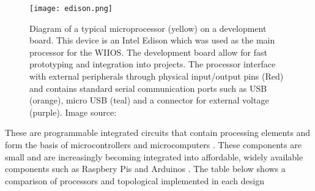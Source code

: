 \begin{figure}[H]
	\centering
	\texttt{[image: edison.png]}
	\caption{Diagram of a typical microprocessor (yellow) on a development board. This device is an Intel Edison which was used as the main processor \textcite{kohout2015device} for the WIIOS. The development board allow for fast prototyping and integration into projects. The processor interface with external peripherals through physical input/output pins (Red) and contains standard serial communication ports such as USB (orange), micro USB (teal) and a connector for external voltage (purple). Image source: \cite{edison} }
\end{figure}

These are programmable integrated circuits that contain processing elements \cite{subham2018micro} and form the basis of microcontrollers and microcomputers \cite{crisp2003introduction}. These components are small and are increasingly becoming integrated into affordable, widely available components such as Raspbery Pis and Arduinos \cite{rabault2019open}. The table below shows a comparison of processors and topological implemented in each design


